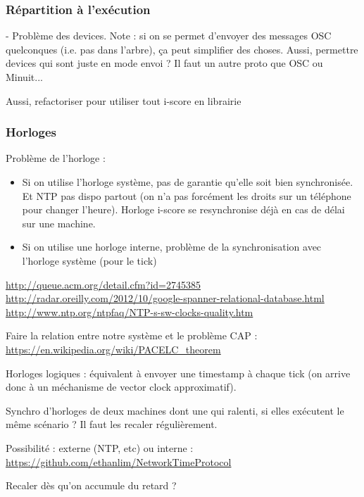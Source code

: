 \documentclass{article}
\begin{document}
\subsubsection{Répartition à l'exécution}

- Problème des devices. Note : si on se permet d'envoyer des messages OSC quelconques (i.e. pas dans l'arbre), ça peut simplifier des choses. Aussi, permettre devices qui sont juste en mode envoi ? Il faut un autre proto que OSC ou Minuit...

Aussi, refactoriser pour utiliser tout i-score en librairie

\subsubsection{Horloges}
Problème de l'horloge : 
\begin{itemize}
\item Si on utilise l'horloge système, pas de garantie qu'elle soit bien synchronisée. 
Et NTP pas dispo partout (on n'a pas forcément les droits sur un téléphone pour changer l'heure).
Horloge i-score se resynchronise déjà en cas de délai sur une machine.
\item Si on utilise une horloge interne, problème de la synchronisation avec l'horloge système (pour le tick)
\end{itemize}

\url{http://queue.acm.org/detail.cfm?id=2745385}
\url{http://radar.oreilly.com/2012/10/google-spanner-relational-database.html}
\url{http://www.ntp.org/ntpfaq/NTP-s-sw-clocks-quality.htm}

Faire la relation entre notre système et le problème CAP : \url{https://en.wikipedia.org/wiki/PACELC_theorem}

Horloges logiques : équivalent à envoyer une timestamp à chaque tick (on arrive donc à un méchanisme de vector clock approximatif). 

Synchro d'horloges de deux machines dont une qui ralenti, si elles exécutent le même 
scénario ? Il faut les recaler régulièrement. 

Possibilité : externe (NTP, etc) ou interne : \url{https://github.com/ethanlim/NetworkTimeProtocol}

Recaler dès qu'on accumule du retard ?
\end{document}
